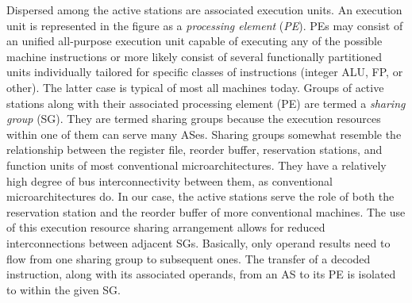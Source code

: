 \documentclass[10pt,dvips]{article}
\begin{document}
Dispersed among the active stations are associated execution
units.  An execution unit is represented in the figure as
a \textit{processing element} (\textit{PE}).  
PEs may consist of an unified all-purpose execution unit capable of
executing any of the possible machine instructions or more likely
consist of
several functionally partitioned units individually tailored
for specific classes of instructions (integer ALU, FP, or other).
The latter case is typical of most all machines today.
Groups of active stations along with their associated processing
element (PE) are termed a \textit{sharing group} (SG).  
They are termed sharing groups because the execution
resources within one of them can serve many ASes.
Sharing groups somewhat resemble
the relationship between the register file, reorder buffer,
reservation stations, and function units of most conventional
microarchitectures.  They have a relatively high degree of bus
interconnectivity between them, as conventional microarchitectures do.
In our case, the active stations serve the role of both the
reservation station and the reorder buffer of more conventional
machines.
The use of this execution resource sharing arrangement allows
for reduced interconnections between adjacent SGs.
Basically, only operand results need to flow from one sharing
group to subsequent ones.
The transfer of a decoded instruction, along with its associated operands,
from an AS to its PE is isolated to within the given SG.
\end{document}

